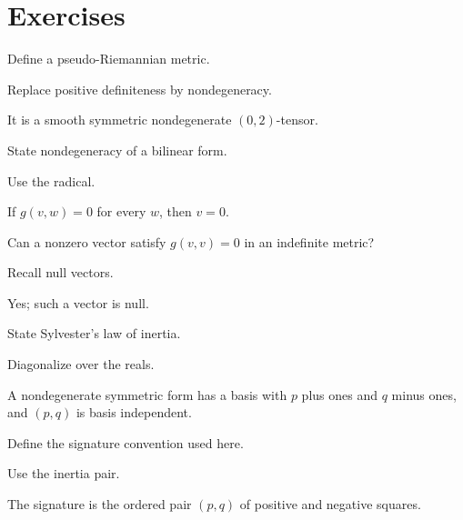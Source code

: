 \section{Exercises}
\begin{exercise}\label{exr:vii29-01}
Define a pseudo-Riemannian metric.
\end{exercise}
\begin{hint}
Replace positive definiteness by nondegeneracy.
\end{hint}
\begin{solution}
It is a smooth symmetric nondegenerate \((0,2)\)-tensor.
\end{solution}

\begin{exercise}\label{exr:vii29-02}
State nondegeneracy of a bilinear form.
\end{exercise}
\begin{hint}
Use the radical.
\end{hint}
\begin{solution}
If \(g(v,w)=0\) for every \(w\), then \(v=0\).
\end{solution}

\begin{exercise}\label{exr:vii29-03}
Can a nonzero vector satisfy \(g(v,v)=0\) in an indefinite metric?
\end{exercise}
\begin{hint}
Recall null vectors.
\end{hint}
\begin{solution}
Yes; such a vector is null.
\end{solution}

\begin{exercise}\label{exr:vii29-04}
State Sylvester's law of inertia.
\end{exercise}
\begin{hint}
Diagonalize over the reals.
\end{hint}
\begin{solution}
A nondegenerate symmetric form has a basis with \(p\) plus ones and \(q\) minus ones, and \((p,q)\) is basis independent.
\end{solution}

\begin{exercise}\label{exr:vii29-05}
Define the signature convention used here.
\end{exercise}
\begin{hint}
Use the inertia pair.
\end{hint}
\begin{solution}
The signature is the ordered pair \((p,q)\) of positive and negative squares.
\end{solution}

